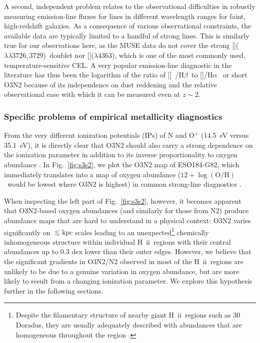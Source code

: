 \documentclass[traditabstract]{aa}
\newcommand{\hb}{H$\beta$}
\newcommand{\ha}{H$\alpha$}
\newcommand{\hii}{\mbox{H~{\sc ii}}}
\newcommand{\oh}{12+\log(\mathrm{O/H})}
\newcommand{\oii}{[\ion{O}{ii}]}
\newcommand{\oiii}{[\ion{O}{iii}]}
\newcommand{\nii}{[\ion{N}{ii}]}
\begin{document}
A second, independent problem relates to the observational difficulties in robustly measuring emission-line fluxes for lines in different wavelength ranges for faint, high-redshift galaxies. As a consequence of various observational constraints, the available data are typically limited to a handful of strong lines. This is similarly true for our observations here, as the MUSE data do not cover the strong \oii($\lambda\lambda3726,3729$)~doublet nor \oiii($\lambda 4363$), which is one of the most commonly used, temperature-sensitive CEL. A very popular emission-line diagnostic in the literature has thus been the logarithm of the ratio of \oiii~/\hb~to \nii/\ha~ or short O3N2 \citep[e.g.,][]{2004MNRAS.348L..59P, 2013A&A...559A.114M} because of its independence on dust reddening and the relative observational ease with which it can be measured even at $z\sim 2$.

\subsubsection{Specific problems of empirical metallicity diagnostics}



From the very different ionization potentials (IPs) of N and O$^{+}$ (14.5~eV versus 35.1~eV), it is {directly} clear that O3N2 should also carry a strong dependence on the ionization parameter in addition to its inverse proportionality to oxygen abundance \citep[e.g.,][]{1979A&A....78..200A, 2015MNRAS.448.2030H}. In Fig.~\ref{fig:s3s2}, we plot the O3N2 map of ESO184-G82, which immediately translates into a map of oxygen abundance ($\oh$~would be lowest where O3N2 is highest) in common strong-line diagnostics \citep{2004MNRAS.348L..59P}.

When inspecting the left part of Fig.~\ref{fig:s3s2}, however, it becomes apparent that O3N2-based oxygen abundances (and similarly for those from N2) produce abundance maps that are hard to understand in a physical context: O3N2 varies significantly on $\lesssim\mathrm{kpc}$ scales leading to an unexpected\footnote{Despite the filamentary structure of nearby giant \hii~regions such as 30 Doradus, they are usually adequately described with abundances that are homogeneous throughout the region \citep[e.g.,][and references therein]{2011ApJ...738...34P}.} chemically inhomogeneous structure within individual \hii~regions with their central abundances up to 0.3 dex lower than their outer edges. However, we believe that the significant gradients in O3N2/N2 observed in most of the \hii~regions are unlikely to be due to a genuine variation in oxygen abundance, but are more likely to result from a changing ionization parameter. We explore this hypothesis further in the following sections.
\end{document}

